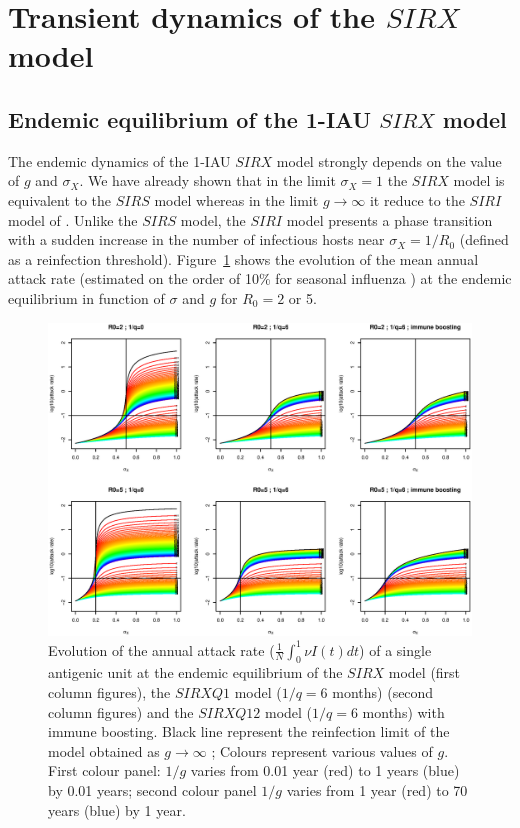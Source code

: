 \section{Transient dynamics of the $SIRX$ model}


\subsection{Endemic equilibrium of the 1-IAU $SIRX$ model}

The endemic dynamics of the 1-IAU $SIRX$ model strongly depends on the
value of $g$ and $\sigma_{X}$. We have already shown that in the limit
$\sigma_{X}=1$ the $SIRX$ model is equivalent to the $SIRS$ model
whereas in the limit $g \to \infty$ it reduce to the $SIRI$ model of
\citep{Gomes2004a}. Unlike the $SIRS$ model, the $SIRI$ model presents
a phase transition with a sudden increase in the number of infectious
hosts near $\sigma_{X} = 1/R_0$ (defined as a reinfection threshold).
Figure~\ref{fig:eq_end} shows the evolution of the mean annual attack
rate (estimated on the order of 10\% for seasonal influenza
\citep{Cox2000a}) at the endemic equilibrium in function of $\sigma$
and $g$ for $R_{0}=2$ or 5.

\begin{figure}[!htbp]
  \center
  \includegraphics[width=0.7\linewidth]{texte/article3/graph/eq_end.eps}
  \caption{Evolution of the annual attack rate ($\frac{1}{N} \int_0^1
    \nu I(t) dt$) of a single antigenic unit at the endemic
    equilibrium of the $SIRX$ model (first column figures), the
    $SIRXQ1$ model ($1/q=6$ months) (second column figures) and the
    $SIRXQ12$ model ($1/q=6$ months) with immune boosting. Black line
    represent the reinfection limit of the model obtained as $g \to
    \infty$ ; Colours represent various values of $g$. First colour
    panel: $1/g$ varies from 0.01 year (red) to 1 years (blue) by 0.01
    years; second colour panel $1/g$ varies from 1 year (red) to 70
    years (blue) by 1 year.}
  \label{fig:eq_end}
\end{figure}

